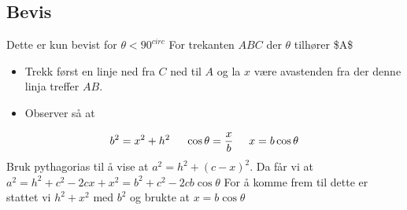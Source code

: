\documentclass{article}
\begin{document}
\subsection{Bevis}
\label{sec-2-2}
Dette er kun bevist for $\theta <90^{circ}$ For trekanten $ABC$ der $\theta$ tilhører \$A\$\\
\begin{itemize}
\item Trekk først en linje ned fra $C$ ned til $A$ og la $x$ være avastenden fra der denne linja treffer $AB$.
\item Observer så at
\end{itemize}
\[
b^2 = x^2 + h^2 \hspace{5mm} \cos{\theta} = \frac{x}{b} \hspace{5mm} x = b\cos{\theta}
\]
Bruk pythagorias til å vise at $a^2 = h^2 + (c-x)^2$. 
Da får vi at $a^2 = h^2 +c^2 -2cx + x^2 = b^2 +c^2 -2cb\cos{\theta}$ \newline
For å komme frem til dette er stattet vi $h^2 +x^2$ med $b^2$ og brukte at $x=b\cos{\theta}$
\end{document}
